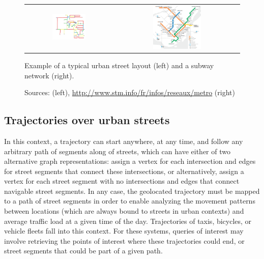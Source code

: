 \documentclass[a4paper,10pt,twoside]{book}
\begin{document}
	\begin{figure}[t]
		\begin{center}
			\begin{tabular}{cc}
				\includegraphics[width=0.4\textwidth]{figures/road-network.png} &
				\includegraphics[width=0.4\textwidth]{figures/mtl-metro-cut.png} \\
			\end{tabular}
		\end{center}
		\caption{Example of a typical urban street layout (left) and a subway network (right).}
		\caption*{\small Sources: \cite{boeing2017osmnx} (left), \url{http://www.stm.info/fr/infos/reseaux/metro} (right)}
		\label{fig:networks}
	\end{figure}
	
	\subsection{Trajectories over urban streets}
	In this context, a trajectory can start anywhere, at any time, and follow any arbitrary path of segments along of streets, which can have either of two alternative graph representations: assign a vertex for each intersection and edges for street segments that connect these intersections, or alternatively, assign a vertex for each street segment with no intersections and edges that connect navigable street segments.
	In any case, the geolocated trajectory must be mapped to a path of street segments in order to enable analyzing the movement patterns between locations (which are always bound to streets in urban contexts) and average traffic load at a given time of the day. 
    Trajectories of taxis, bicycles, or vehicle fleets fall into this context. For these systems, queries of interest may involve retrieving the points of interest where these trajectories could end, or street segments that could be part of a given path.
    
\end{document}
